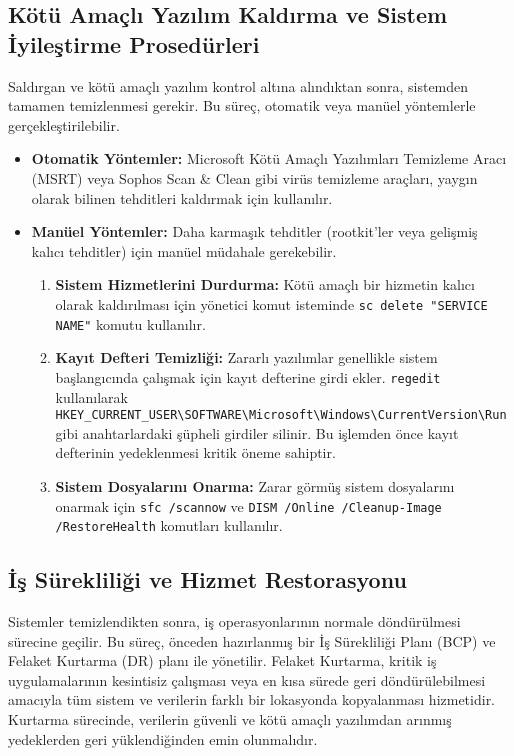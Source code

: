 \subsection{Kötü Amaçlı Yazılım Kaldırma ve Sistem İyileştirme Prosedürleri}

Saldırgan ve kötü amaçlı yazılım kontrol altına alındıktan sonra, sistemden tamamen temizlenmesi gerekir. Bu süreç, otomatik veya manüel yöntemlerle gerçekleştirilebilir.

\begin{itemize}
    \item \textbf{Otomatik Yöntemler:} Microsoft Kötü Amaçlı Yazılımları Temizleme Aracı (MSRT) veya Sophos Scan \& Clean gibi virüs temizleme araçları, yaygın olarak bilinen tehditleri kaldırmak için kullanılır.
    \item \textbf{Manüel Yöntemler:} Daha karmaşık tehditler (rootkit'ler veya gelişmiş kalıcı tehditler) için manüel müdahale gerekebilir.
    \begin{enumerate}
        \item \textbf{Sistem Hizmetlerini Durdurma:} Kötü amaçlı bir hizmetin kalıcı olarak kaldırılması için yönetici komut isteminde \texttt{sc delete "SERVICE NAME"} komutu kullanılır.
        \item \textbf{Kayıt Defteri Temizliği:} Zararlı yazılımlar genellikle sistem başlangıcında çalışmak için kayıt defterine girdi ekler. \texttt{regedit} kullanılarak \texttt{HKEY\_CURRENT\_USER\textbackslash{}SOFTWARE\textbackslash{}Microsoft\textbackslash{}Windows\textbackslash{}CurrentVersion\textbackslash{}Run} gibi anahtarlardaki şüpheli girdiler silinir. Bu işlemden önce kayıt defterinin yedeklenmesi kritik öneme sahiptir.
        \item \textbf{Sistem Dosyalarını Onarma:} Zarar görmüş sistem dosyalarını onarmak için \texttt{sfc /scannow} ve \texttt{DISM /Online /Cleanup-Image /RestoreHealth} komutları kullanılır.
    \end{enumerate}
\end{itemize}

\subsection{İş Sürekliliği ve Hizmet Restorasyonu}

Sistemler temizlendikten sonra, iş operasyonlarının normale döndürülmesi sürecine geçilir. Bu süreç, önceden hazırlanmış bir İş Sürekliliği Planı (BCP) ve Felaket Kurtarma (DR) planı ile yönetilir. Felaket Kurtarma, kritik iş uygulamalarının kesintisiz çalışması veya en kısa sürede geri döndürülebilmesi amacıyla tüm sistem ve verilerin farklı bir lokasyonda kopyalanması hizmetidir. Kurtarma sürecinde, verilerin güvenli ve kötü amaçlı yazılımdan arınmış yedeklerden geri yüklendiğinden emin olunmalıdır.

